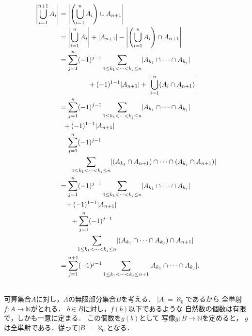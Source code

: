 \begin{description}
  \begin{align*}
    \left \lvert \bigcup_{i=1}^{n+1} A_i \right \rvert 
    & =\left \lvert \left( \bigcup_{i=1}^{n} A_i \right) \cup A_{n+1} 
      \right \rvert \\
      \allowdisplaybreaks[4]
    & = \left \lvert \bigcup_{i=1}^{n} A_i \right \rvert 
      + \lvert A_{n+1} \rvert - 
      \left \lvert \left( \bigcup_{i=1}^{n} A_i \right) \cap A_{n+1} \right \rvert \\
    & = \sum_{j=1}^{n} (-1)^{j-1} \sum_{1 \leq k_1 < \cdots < k_j \leq n }
      \lvert A_{k_1} \cap \cdots \cap A_{k_j} \rvert  \\
    &  \hspace{1.5cm} + (-1)^{1-1} \lvert A_{n+1} \rvert 
      + \left \lvert \bigcup_{i=1}^{n} ( A_i \cap A_{n+1} ) \right \rvert \\
    & = \sum_{j=1}^{n} (-1)^{j-1} \sum_{1 \leq k_1 < \cdots < k_j \leq n }
      \lvert A_{k_1} \cap \cdots \cap A_{k_j} \rvert  \\
    &  \hspace{0.2cm} + (-1)^{1-1} \lvert A_{n+1} \rvert \\
    &  \hspace{0.4cm} \sum_{j=1}^{n} (-1)^{j-1} \\
    &  \hspace{0.6cm}  \sum_{1 \leq k_1 < \cdots < k_j \leq n} 
      \lvert (A_{k_1} \cap A_{n+1} ) \cap \cdots \cap (A_{k_j} \cap A_{n+1}) \rvert \\ 
    & = \sum_{j=1}^{n} (-1)^{j-1} \sum_{1 \leq k_1 < \cdots < k_j \leq n }
      \lvert A_{k_1} \cap \cdots \cap A_{k_j} \rvert  \\
    &  \hspace{0.3cm} + (-1)^{1-1} \lvert A_{n+1} \rvert \\
    &  \hspace{0.6cm} + \sum_{j=1}^{n} (-1)^{j-1} \\
    &  \hspace{0.9cm}  \sum_{1 \leq k_1 < \cdots < k_j \leq n} 
      \lvert (A_{k_1} \cap \cdots \cap A_{k_j} ) \cap A_{n+1} \rvert \\
      & = \sum_{j=1}^{n+1}(-1)^{j-1} 
      \sum_{1 \leq k_1 < \cdots < k_j \leq n+1} 
      \lvert A_{k_1} \cap \cdots \cap A_{k_j}   \rvert .
  \end{align*}

\item[\refque{que:casansubcasan}] \mbox{} \\
  可算集合$A$に対し，$A$の無限部分集合$B$を考える．
  $\lvert A \rvert = \aleph _0$であるから
  全単射$f: A \longrightarrow \mathbb{N}$がとれる．
  $b \in B$に対し，$f(b)$以下であるような
  自然数の個数は有限で，しかも一意に定まる．
  この個数を$g(b)$として
  写像$g: B \longrightarrow \mathbb{N}$を定めると，
  $g$は全単射である．従って$\lvert B \rvert = \aleph _0$となる．



\end{description}
